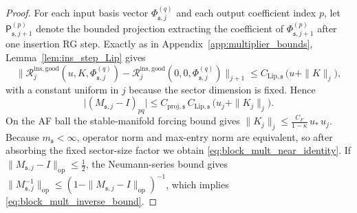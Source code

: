 \begin{proof}
For each input basis vector $\Phi_{\mathfrak s,j}^{(q)}$ and each output coefficient index $p$,
let $\mathsf P^{(p)}_{\mathfrak s,j+1}$ denote the bounded projection extracting the coefficient of
$\Phi_{\mathfrak s,j+1}^{(p)}$ after one insertion RG step.
Exactly as in Appendix~\ref{app:multiplier_bounds}, Lemma~\ref{lem:ins_step_Lip} gives
\[
\big\|\mathcal R^{\mathrm{ins,good}}_j(u,K,\Phi_{\mathfrak s,j}^{(q)})
-\mathcal R^{\mathrm{ins,good}}_j(0,0,\Phi_{\mathfrak s,j}^{(q)})\big\|_{j+1}
\le C_{\mathrm{Lip},\mathfrak s}\,\bigl(u+\|K\|_j\bigr),
\]
with a constant uniform in $j$ because the sector dimension is fixed.
Hence
\[
\big|(M_{\mathfrak s,j}-I)_{pq}\big|
\le C_{\mathrm{proj},\mathfrak s}\,C_{\mathrm{Lip},\mathfrak s}\,\bigl(u_j+\|K_j\|_j\bigr).
\]
On the AF ball the stable-manifold forcing bound gives
$\|K_j\|_j\le \frac{C_F}{1-\kappa}\,u_\ast\,u_j$.
Because $m_{\mathfrak s}<\infty$, operator norm and max-entry norm are equivalent, so after absorbing the fixed sector-size factor we obtain
\eqref{eq:block_mult_near_identity}.
If $\|M_{\mathfrak s,j}-I\|_{\mathrm{op}}\le \tfrac12$, the Neumann-series bound gives
$\|M_{\mathfrak s,j}^{-1}\|_{\mathrm{op}}\le (1-\|M_{\mathfrak s,j}-I\|_{\mathrm{op}})^{-1}$,
which implies \eqref{eq:block_mult_inverse_bound}.
\end{proof}

